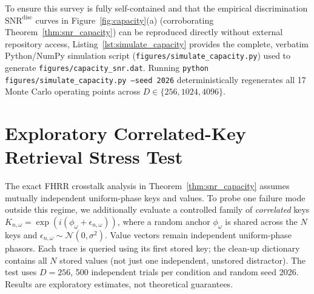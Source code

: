 \documentclass[11pt,a4paper]{article}
\newcommand{\SNR}{\mathrm{SNR}}                 %
\theoremstyle{plain}
\theoremstyle{definition}
\theoremstyle{remark}
\begin{document}
To ensure this survey is fully self-contained and that the empirical discrimination $\SNR^{\mathrm{disc}}$ curves in Figure~\ref{fig:capacity}(a) (corroborating Theorem~\ref{thm:snr_capacity}) can be reproduced directly without external repository access, Listing~\ref{lst:simulate_capacity} provides the complete, verbatim Python/NumPy simulation script (\texttt{figures/simulate\_capacity.py}) used to generate \texttt{figures/capacity\_snr.dat}.
Running \texttt{python figures/simulate\_capacity.py --seed 2026} deterministically regenerates all 17 Monte Carlo operating points across $D \in \{256, 1024, 4096\}$.




\clearpage
\section{Exploratory Correlated-Key Retrieval Stress Test}\label{app:correlated}
The exact FHRR crosstalk analysis in Theorem~\ref{thm:snr_capacity} assumes mutually independent uniform-phase keys and values. To probe one failure mode outside this regime, we additionally evaluate a controlled family of \emph{correlated} keys $K_{n,\omega}=\exp(i(\phi_\omega+\epsilon_{n,\omega}))$, where a random anchor $\phi_\omega$ is shared across the $N$ keys and $\epsilon_{n,\omega}\sim\mathcal N(0,\sigma^2)$. Value vectors remain independent uniform-phase phasors. Each trace is queried using its first stored key; the clean-up dictionary contains all $N$ stored values (not just one independent, unstored distractor). The test uses $D=256$, 500 independent trials per condition and random seed 2026. Results are exploratory estimates, not theoretical guarantees.
\end{document}
